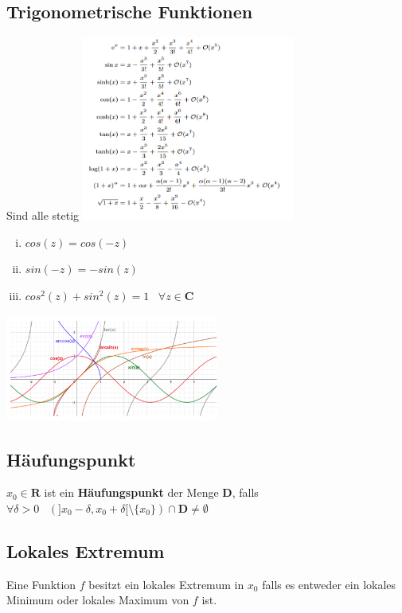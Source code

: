 \documentclass[8pt]{article}
\begin{document}
\begin{multicols*}{3}
\subsection{Trigonometrische Funktionen}
Sind alle stetig
\includegraphics[width=7cm]{taylor.png}

\begin{enumerate}[(i)]
  \item $cos(z) = cos(-z)$
  \item $sin(-z) = -sin(z)$
  \item $cos^2(z) + sin^2(z) = 1 \;\;\; \forall z \in \mathbf{C}$
\end{enumerate}
\includegraphics[width=7cm]{functions.png}

\subsection{Häufungspunkt}

$x_0 \in \mathbf{R}$ ist ein \textbf{Häufungspunkt} der Menge $\mathbf{D}$,
falls $\forall \delta > 0 \;\;\; (]x_0 - \delta, x_0 + \delta[ \setminus \{x_0\}) \cap \mathbf{D} \neq \emptyset$

\subsection{Lokales Extremum}

Eine Funktion $f$ besitzt ein lokales Extremum in $x_0$ falls es entweder ein lokales Minimum oder lokales Maximum von $f$ ist.


\end{multicols*}
\end{document}
